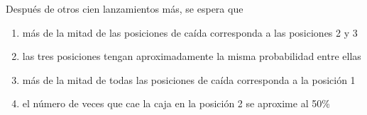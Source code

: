 \documentclass[letterpaper,fleqn]{article}
\begin{document}
\begin{enumerate}
  Después de otros cien lanzamientos más, se espera que
  \begin{enumerate}
    \item más de la mitad de las posiciones de caída corresponda a las posiciones 2 y 3
    \item las tres posiciones tengan aproximadamente la misma probabilidad entre ellas
    \item más de la mitad de todas las posiciones de caída corresponda a la posición 1
    \item el número de veces que cae la caja en la posición 2 se aproxime al 50\%
  \end{enumerate}
\end{enumerate}
\end{document}
